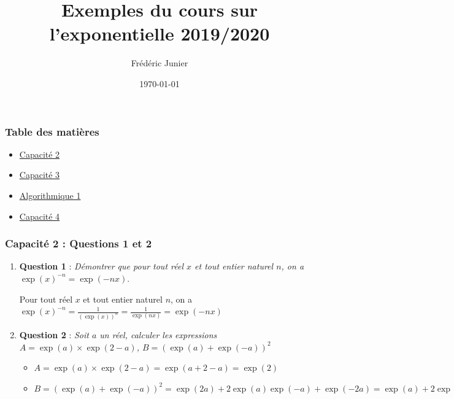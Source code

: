 \documentclass[11pt, hyperref={urlcolor=red,%
            linkcolor=blue, %
            colorlinks=true}]{beamer}
\title[exponentielle]{Exemples du cours sur l'exponentielle 2019/2020}
\author[F.Junier]{Fr\'ed\'eric Junier}
\institute[Le Parc]{{\centering Lyc\'ee du Parc \\
1 Boulevard Anatole France \\ 69006 Lyon }}
\date[\today]{\today}
\begin{document}
\frame{\titlepage}




\begin{frame}
\frametitle{Table des matières}
\begin{itemize}
	\item \hyperlink{capacite2}{Capacité 2}
    \item \hyperlink{capacite3}{Capacité 3}
    \item \hyperlink{algo1}{Algorithmique 1}
    \item \hyperlink{capacite4}{Capacité 4}
\end{itemize}

\end{frame}

\begin{frame}
\frametitle{Capacité 2 : Questions 1 et 2}
\label{capacite2}
\begin{enumerate}
    \item \textbf{Question 1} : \textit{Démontrer que pour tout réel $x$ et  tout entier naturel $n$, on a $\exp(x)^{-n}=\exp(-nx)$}.
    
 Pour tout réel $x$  et  tout entier naturel $n$, on a $\exp(x)^{-n}=\frac{1}{\left(\exp(x)\right)^{n}}= \frac{1}{\exp(nx)}=\exp(-nx)$
 
 
	\item \textbf{Question 2} : {\itshape Soit $a$ un réel, calculer les expressions $A=\exp(a) \times \exp(2-a)$, $B=\left(\exp(a)+\exp(-a)\right)^{2}$ }
	
	\begin{itemize}
\item $A=\exp(a) \times \exp(2-a)=\exp(a+2-a)=\exp(2)$
\item $B=\left(\exp(a)+\exp(-a)\right)^{2}=\exp(2a)+2\exp(a)\exp(-a)+\exp(-2a)=\exp(a)+2\exp(0)+\exp(-a)=\exp(a)+\exp(-a)+2$
		
	\end{itemize}
	
	

\end{enumerate}
\end{frame}
\end{document}
